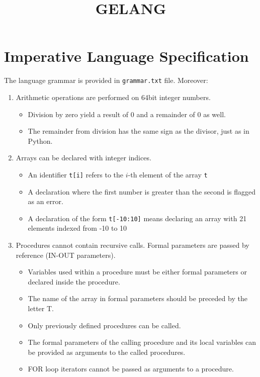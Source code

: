 \documentclass{article}
\begin{document}
\title{GELANG}
\author{}
\date{}
\maketitle

\section*{Imperative Language Specification}

The language grammar is provided in \texttt{grammar.txt} file. Moreover:

\begin{enumerate}
    \item Arithmetic operations are performed on 64bit integer numbers. 
    \begin{itemize}
        \item Division by zero yield a result of 0 and a remainder of 0 as well.
        \item The remainder from division has the same sign as the divisor, just as in Python.
    \end{itemize}
    
    \item Arrays can be declared with integer indices. 
    \begin{itemize}
        \item An identifier \texttt{t[i]} refers to the $i$-th element of the array \texttt{t}
        \item A declaration where the first number is greater than the second is flagged as an error.
        \item A declaration of the form \texttt{t[-10:10]} means declaring an array with 21 elements indexed from -10 to 10
    \end{itemize}
    
    \item Procedures cannot contain recursive calls. Formal parameters are passed by reference (IN-OUT parameters).
    \begin{itemize}
        \item Variables used within a procedure must be either formal parameters or declared inside the procedure.
        \item The name of the array in formal parameters should be preceded by the letter T.
        \item Only previously defined procedures can be called.
        \item The formal parameters of the calling procedure and its local variables can be provided as arguments to the called procedures.
        \item FOR loop iterators cannot be passed as arguments to a procedure.
    \end{itemize}


\end{enumerate}
\end{document}
